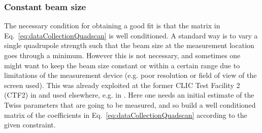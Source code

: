 \subsubsection{Constant beam size}

The necessary condition for obtaining a good fit is that the matrix in
Eq.~\ref{eq:dataCollectionQuadscan} is well conditioned. 
A standard way is to vary a single quadrupole strength such that the
beam size at the measurement location goes through a minimum. 
However this is not necessary, and sometimes one might want to keep the
beam size constant or within a certain range due to limitations of the
measurement device (e.g. poor resolution or field of view of the screen
used).
This was already exploited at the former CLIC Test Facility 2 (CTF2) in
\cite{Tenenbaum1997} and used elsewhere, e.g. in \cite{prat2014}.
Here one needs an initial estimate of the Twiss parameters that are
going to be measured, and so build a well conditioned matrix of the
coefficients in Eq.~\ref{eq:dataCollectionQuadscan} according to the
given constraint.

